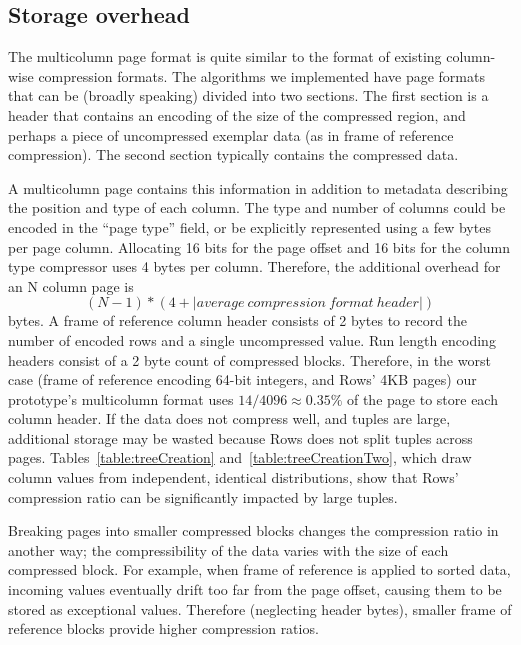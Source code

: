 \documentclass{sig-alternate-sigmod08}
\newcommand{\rows}{Rows\xspace}
\newcommand{\rowss}{Rows'\xspace}
\begin{document}
\subsection{Storage overhead}

The multicolumn page format is quite similar to the format of existing
column-wise compression formats.  The algorithms we implemented have
page formats that can be (broadly speaking) divided into two sections.
The first section is a header that contains an encoding of the size of
the compressed region, and perhaps a piece of uncompressed exemplar
data (as in frame of reference compression).  The second section
typically contains the compressed data.

A multicolumn page contains this information in addition to metadata
describing the position and type of each column.  The type and number
of columns could be encoded in the ``page type'' field, or be
explicitly represented using a few bytes per page column.  Allocating
16 bits for the page offset and 16 bits for the column type compressor
uses 4 bytes per column.  Therefore, the additional overhead for an N
column page is
\[
   (N-1) * (4 + |average~compression~format~header|)
\]
bytes.  A frame of reference column header consists of 2 bytes to
record the number of encoded rows and a single uncompressed
value. Run length encoding headers consist of a 2 byte count of
compressed blocks.  Therefore, in the worst case (frame of reference
encoding 64-bit integers, and \rowss 4KB pages) our prototype's
multicolumn format uses $14/4096\approx0.35\%$ of the page to store
each column header.  If the data does not compress well, and tuples
are large, additional storage may be wasted because \rows does not
split tuples across pages.  Tables~\ref{table:treeCreation}
and~\ref{table:treeCreationTwo}, which draw column values from
independent, identical distributions, show that \rowss compression
ratio can be significantly impacted by large tuples.


Breaking pages into smaller compressed blocks changes the compression
ratio in another way; the compressibility of the data varies with the
size of each compressed block.  For example, when frame of reference
is applied to sorted data, incoming values eventually drift too far
from the page offset, causing them to be stored as exceptional values.
Therefore (neglecting header bytes), smaller frame of reference blocks
provide higher compression ratios.
\end{document}
